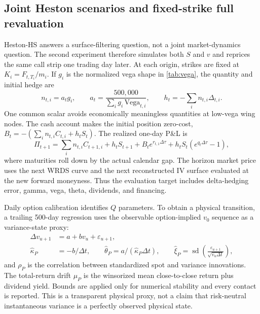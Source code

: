 \documentclass[11pt,a4paper]{article}
\begin{document}
\subsection{Joint Heston scenarios and fixed-strike full revaluation}

Heston-HS answers a surface-filtering question, not a joint market-dynamics question. The second
experiment therefore simulates both $S$ and $v$ and reprices the same call strip one trading day
later. At each origin, strikes are fixed at $K_i=F_{t,T_i}/m_i$. If $g_i$ is the normalized vega
shape in \cref{tab:vega}, the quantity and initial hedge are
\begin{equation}
n_{t,i}=a_t g_i,\qquad
a_t=\frac{500{,}000}{\sum_i g_i\,\mathrm{Vega}_{t,i}},\qquad
h_t=-\sum_i n_{t,i}\Delta_{t,i}.
\end{equation}
One common scalar avoids economically meaningless quantities at low-vega wing nodes. The cash
account makes the initial position zero-cost,
$B_t=-(\sum_i n_{t,i}C_{t,i}+h_tS_t)$. The realized one-day P\&L is
\begin{equation}
\Pi_{t+1}=\sum_i n_{t,i}C_{t+1,i}+h_tS_{t+1}
+B_t e^{r_{t,1}\Delta\tau}+h_tS_t\!\left(e^{q_t\Delta\tau}-1\right),
\end{equation}
where maturities roll down by the actual calendar gap. The horizon market price uses the next WRDS
curve and the next reconstructed IV surface evaluated at the new forward moneyness. Thus the
evaluation target includes delta-hedging error, gamma, vega, theta, dividends, and financing.

Daily option calibration identifies $Q$ parameters. To obtain a physical transition, a trailing
500-day regression uses the observable option-implied $v_0$ sequence as a variance-state proxy:
\begin{align}
\Delta v_{u+1}&=a+bv_u+\varepsilon_{u+1},\\
\widehat\kappa_P&=-b/\Delta t,\qquad
\widehat\theta_P=a/(\widehat\kappa_P\Delta t),\qquad
\widehat\xi_P=\operatorname{sd}\!\left(
\frac{\varepsilon_{u+1}}{\sqrt{v_u\Delta t}}\right),
\end{align}
and $\rho_P$ is the correlation between standardized spot and variance innovations. The total-return
drift $\mu_P$ is the winsorized mean close-to-close return plus dividend yield. Bounds are applied
only for numerical stability and every contact is reported. This is a transparent physical proxy,
not a claim that risk-neutral instantaneous variance is a perfectly observed physical state.
\end{document}
